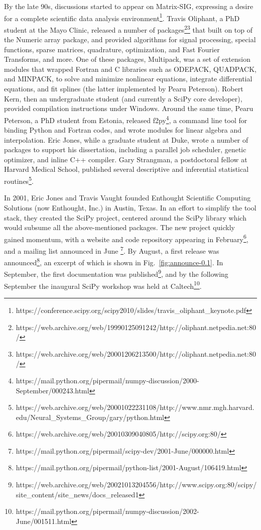 \documentclass[fleqn,10pt]{wlscirep}
\begin{document}
By the late 90s, discussions started to appear on Matrix-SIG,
expressing a desire for a complete scientific data analysis environment\footnote{https://conference.scipy.org/scipy2010/slides/travis\_oliphant\_keynote.pdf}.
Travis Oliphant, a PhD student at the Mayo Clinic,
released a number of packages\footnote{https://web.archive.org/web/19990125091242/http://oliphant.netpedia.net:80/}\footnote{https://web.archive.org/web/20001206213500/http://oliphant.netpedia.net:80/} that built on top of the Numeric array
package, and provided algorithms for signal processing, special
functions, sparse matrices, quadrature, optimization, and Fast Fourier
Transforms, and more.  One of these packages, Multipack, was a set of
extension modules that wrapped Fortran and C libraries such as
ODEPACK, QUADPACK, and MINPACK, to solve and minimize nonlinear
equations, integrate differential equations, and fit splines (the
latter implemented by Pearu Peterson).  Robert Kern, then an
undergraduate student (and currently a SciPy core developer), provided
compilation instructions under Windows.
Around the same time, Pearu Peterson, a PhD student from Estonia,
released f2py\footnote{https://mail.python.org/pipermail/numpy-discussion/2000-September/000243.html}, a command line tool for binding Python and Fortran
codes, and wrote modules for linear algebra and interpolation.
Eric Jones, while a graduate student at Duke, wrote a number of
packages to support his dissertation, including a parallel job
scheduler, genetic optimizer, and inline C++ compiler.
%
%
Gary Strangman, a postdoctoral fellow at Harvard Medical School,
published several descriptive and inferential statistical routines\footnote{https://web.archive.org/web/20001022231108/http://www.nmr.mgh.harvard.edu/Neural\_Systems\_Group/gary/python.html}.

In 2001, Eric Jones and Travis Vaught founded Enthought Scientific
Computing Solutions (now Enthought, Inc.) in Austin, Texas.  In an
effort to simplify the tool stack, they created the SciPy project,
centered around the SciPy library which would subsume all the
above-mentioned packages.
The new project quickly gained momentum, with a website and code
repository appearing in
February\footnote{https://web.archive.org/web/20010309040805/http://scipy.org:80/}, and
a mailing list announced in
June \footnote{https://mail.python.org/pipermail/scipy-dev/2001-June/000000.html}. By
August, a first release was announced\footnote{https://mail.python.org/pipermail/python-list/2001-August/106419.html}, an excerpt of which is shown in
Fig.~\ref{fig:announce-0.1}.
In September, the first documentation was
published\footnote{https://web.archive.org/web/20021013204556/http://www.scipy.org:80/scipy/site\_content/site\_news/docs\_released1},
and by the following September the inaugural SciPy workshop was held
at Caltech\footnote{https://mail.python.org/pipermail/numpy-discussion/2002-June/001511.html}.
\end{document}
